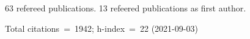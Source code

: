 63 refereed publications. 13 refeered publications as first author.

Total citations~=~1942; h-index~=~22 (2021-09-03)